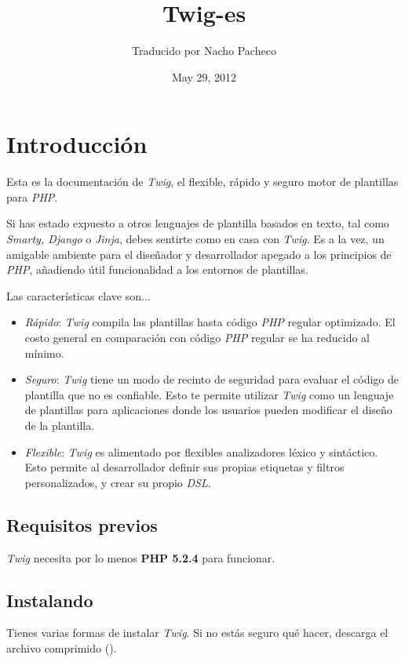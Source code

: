 \documentclass[letterpaper,10pt,spanish]{sphinxmanual}
\title{Twig-es}
\date{May 29, 2012}
\author{Traducido por Nacho Pacheco}
\begin{document}
\maketitle
\tableofcontents
{}\label{index::doc}



\part{Introducción}
\label{intro:introduccion}\label{intro:twig}\label{intro::doc}
Esta es la documentación de \emph{Twig}, el flexible, rápido y seguro motor de plantillas para \emph{PHP}.

Si has estado expuesto a otros lenguajes de plantilla basados en texto, tal como \emph{Smarty, Django} o \emph{Jinja}, debes sentirte como en casa con \emph{Twig}. Es a la vez, un amigable ambiente para el diseñador y desarrollador apegado a los principios de \emph{PHP}, añadiendo útil funcionalidad a los entornos de plantillas.

Las características clave son...
\begin{itemize}
\item {} 
\emph{Rápido}: \emph{Twig} compila las plantillas hasta código \emph{PHP} regular optimizado. El costo general en comparación con código \emph{PHP} regular se ha reducido al mínimo.

\item {} 
\emph{Seguro}: \emph{Twig} tiene un modo de recinto de seguridad para evaluar el código de plantilla que no es confiable. Esto te permite utilizar \emph{Twig} como un lenguaje de plantillas para aplicaciones donde los usuarios pueden modificar el diseño de la plantilla.

\item {} 
\emph{Flexible}: \emph{Twig} es alimentado por flexibles analizadores léxico y sintáctico. Esto permite al desarrollador definir sus propias etiquetas y filtros personalizados, y crear su propio \emph{DSL}.

\end{itemize}


\chapter{Requisitos previos}
\label{intro:requisitos-previos}
\emph{Twig} necesita por lo menos \textbf{PHP 5.2.4} para funcionar.


\chapter{Instalando}
\label{intro:instalando}
Tienes varias formas de instalar \emph{Twig}. Si no estás seguro qué hacer, descarga el archivo comprimido ().
\end{document}
